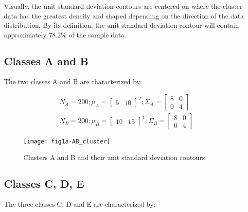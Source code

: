 Visually, the unit standard deviation contours are centered on where the cluster data has the greatest density and shaped depending on the direction of the data distribution. By its definition, the unit standard deviation contour will contain approximately 78.2\% of the sample data.
 
 \subsection{Classes A and B}
 The two classes A and B are characterized by:

\begin{eqnarray}
N_{A}=200; {\mu}_{A}=\left[ \begin{smallmatrix} 5&10 \end{smallmatrix}\right]^{T}; {\Sigma}_{A}=\left[ \begin{smallmatrix} 8&0 \\ 0&4 \end{smallmatrix}\right] \nonumber\\
N_{B}=200; {\mu}_{B}=\left[ \begin{smallmatrix} 10&15 \end{smallmatrix}\right]^{T}; {\Sigma}_{B}=\left[ \begin{smallmatrix} 8&0 \\ 0&4 \end{smallmatrix}\right] \nonumber
\end{eqnarray}

\begin{figure}[ht]
\centering
	\texttt{[image: fig1a-AB\_cluster]}
	\label{fig:clustersDataAB}
	\caption{Clusters A and B and their unit standard deviation contours}
\end{figure}

 \subsection{Classes C, D, E}
 The three classes C, D and E are characterized by:
 
